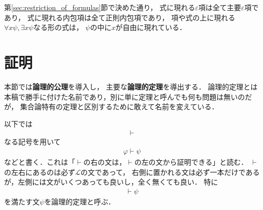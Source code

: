 	第\ref{sec:restriction_of_formulas}節で決めた通り，
	式に現れる$\varepsilon$項は全て主要$\varepsilon$項であり，
	式に現れる内包項は全て正則内包項であり，
	項や式の上に現れる$\forall x \psi,\exists x \psi$なる形の式は，
	$\psi$の中に$x$が自由に現れている．
	
\section{証明}
	本節では{\bf 論理的公理}を導入し，
	主要な{\bf 論理的定理}を導出する．
	論理的定理とは本稿で勝手に付けた名前であり，別に単に定理と呼んでも何も問題は無いのだが，
	集合論特有の定理と区別するために敢えて名前を変えている．
	
	以下では
	\begin{align}
		\vdash
	\end{align}
	なる記号を用いて
	\begin{align}
		\varphi \vdash \psi
	\end{align}
	などと書く．これは「$\vdash$の右の文は，$\vdash$の左の文から証明できる」と読む．
	$\vdash$の左右にあるのは必ず$\mathcal{L}$の文であって，
	右側に置かれる文は必ず一本だけであるが，左側には文がいくつあっても良いし，全く無くても良い．
	特に
	\begin{align}
		\vdash \psi
	\end{align}
	を満たす文$\psi$を論理的定理と呼ぶ．
	
	
	

